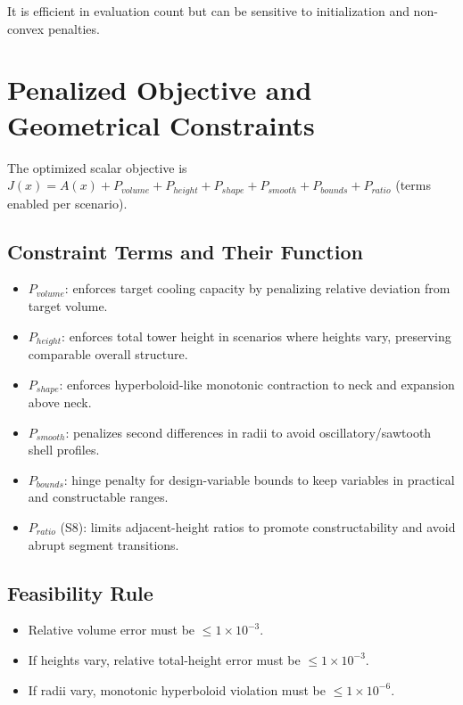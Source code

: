 It is efficient in evaluation count but can be sensitive to initialization and non-convex penalties.


\chapter{Penalized Objective and Geometrical Constraints}

The optimized scalar objective is \(J(x) = A(x) + P_{volume} + P_{height} + P_{shape} + P_{smooth} + P_{bounds} + P_{ratio}\) (terms enabled per scenario).


\section{Constraint Terms and Their Function}

\begin{itemize}
\item \(P_{volume}\): enforces target cooling capacity by penalizing relative deviation from target volume.
\item \(P_{height}\): enforces total tower height in scenarios where heights vary, preserving comparable overall structure.
\item \(P_{shape}\): enforces hyperboloid-like monotonic contraction to neck and expansion above neck.
\item \(P_{smooth}\): penalizes second differences in radii to avoid oscillatory/sawtooth shell profiles.
\item \(P_{bounds}\): hinge penalty for design-variable bounds to keep variables in practical and constructable ranges.
\item \(P_{ratio}\) (S8): limits adjacent-height ratios to promote constructability and avoid abrupt segment transitions.
\end{itemize}

\section{Feasibility Rule}

\begin{itemize}
\item Relative volume error must be \(\leq 1 \times 10^{-3}\).
\item If heights vary, relative total-height error must be \(\leq 1 \times 10^{-3}\).
\item If radii vary, monotonic hyperboloid violation must be \(\leq 1 \times 10^{-6}\).
\end{itemize}

